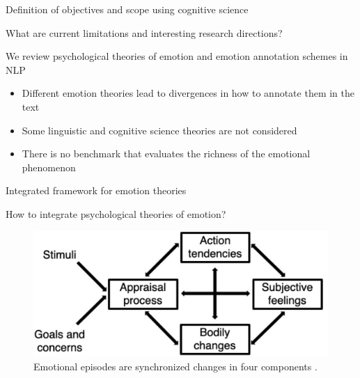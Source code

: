 \documentclass[handout,10pt]{beamer}
\begin{document}
\begin{frame}{Definition of objectives and scope using cognitive science}

What are current limitations and interesting research directions?

\pause
\vspace{0.5cm}

We review psychological theories of emotion and emotion annotation schemes in NLP

\pause
\vspace{0.5cm}


\begin{itemize}[<+->]
    \item Different emotion theories lead to divergences in how to annotate them in the text
    \item Some linguistic and cognitive science theories are not considered
    \item There is no benchmark that evaluates the richness of the emotional phenomenon
\end{itemize}




    
\end{frame}

\begin{frame}{Integrated framework for emotion theories}

How to integrate psychological theories of emotion?

\pause
\vspace{0.5cm}


\begin{figure}
    \centering
    \includegraphics[width=0.8\linewidth]{img/scherer_integrated_framework.png}
    \caption{Emotional episodes are synchronized changes in four components \citep{schererTheoryConvergenceEmotion2022a}.}
    \label{fig:placeholder}
\end{figure}
    
\end{frame}
\end{document}
